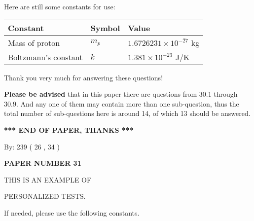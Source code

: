 \documentclass[12pt]{article}
\begin{document}
 
 
   
   
 \vspace{0.2in}
Here are still some constants for use:
 
 
\noindent\begin{tabular}{|l|l|l|}
\hline
Constant & Symbol & Value \\
\hline
 
Mass of proton &
$m_p$ &
 $ 1.6726231 \times 10^{-27} $
kg \\
\hline
 
Boltzmann's constant &
$k$ &
 $ 1.381 \times 10^{-23} $
J/K \\
\hline
 
\end{tabular}
 
Thank you very much for answering these questions!
 
{\textbf{\large{Please be advised}}} that in this paper there are questions from
30.1 through
30.9.
And any one of them may contain more than one sub-question, thus the total number
of sub-questions here is around 14, of which
13 should be answered.
 
   
   
   
   
\vspace{1.0in} 
{\textbf{\large{ *** END OF PAPER, THANKS *** }}} 
   
   
\hspace{1.0in} By: 
         239 (          26 ,           34 )
   
   
   
   
\newpage 
\setcounter{page}{ 
    31001 } 
   
   
   
   
 {\textbf{ \Large{ PAPER NUMBER           31  }}}
   
   
\vspace{0.2in}
   
   
   
   
   
   
 \vspace{0.2in}
 
 
{\Huge  THIS IS AN EXAMPLE OF}
 
{\Huge  PERSONALIZED TESTS. }
 
If needed, please use the following constants.
 
\end{document}

